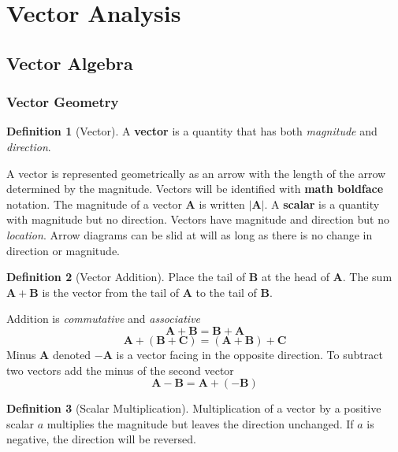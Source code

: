 \documentclass{article}
\theoremstyle{definition}
\newtheorem*{definition}{Definition}
\theoremstyle{remark}
\newcommand{\abs}[1]{\left|#1\right|}
\renewcommand{\vec}{\mathbf}
\newcommand{\veca}{\vec{A}}
\newcommand{\vecb}{\vec{B}}
\newcommand{\vecc}{\vec{C}}
\begin{document}
\renewcommand{\theenumi}{\alph{enumi}}
\pagestyle{fancy}

\section{Vector Analysis}
\subsection{Vector Algebra}
\subsubsection{Vector Geometry}

\begin{definition}[Vector]
A \textbf{vector} is a quantity that has both \textit{magnitude} and \textit{direction}.
\end{definition}

\noindent A vector is represented geometrically as an arrow with the length of the arrow determined by the magnitude. Vectors will be identified with \textbf{math boldface} notation. The magnitude of a vector $\veca$ is written $\abs{\veca}$. A \textbf{scalar} is a quantity with magnitude but no direction. Vectors have magnitude and direction but no \textit{location}. Arrow diagrams can be slid at will as long as there is no change in direction or magnitude.

\begin{definition}[Vector Addition]
Place the tail of $\vecb$ at the head of $\veca$. The sum $\veca+\vecb$ is the vector from the tail of $\veca$ to the tail of $\vecb$.
\end{definition}

\noindent Addition is \textit{commutative} and \textit{associative}
\[\veca+\vecb = \vecb+\veca\]
\[\veca+(\vecb+\vecc) = (\veca+\vecb)+\vecc\]
Minus $\veca$ denoted $-\veca$ is a vector facing in the opposite direction. To subtract two vectors add the minus of the second vector
\[\veca-\vecb = \veca+(-\vecb)\]

\begin{definition}[Scalar Multiplication]
Multiplication of a vector by a positive scalar $a$ multiplies the magnitude but leaves the direction unchanged. If $a$ is negative, the direction will be reversed.
\end{definition}
\end{document}
